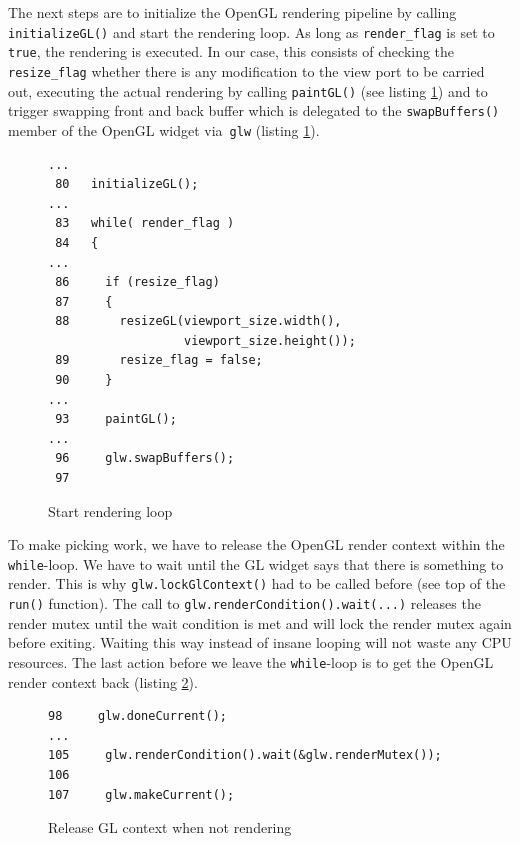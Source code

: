 \documentclass[jou,noapacite]{apa}
\begin{document}
The next steps are to initialize the OpenGL rendering pipeline by
calling \lstinline|initializeGL()| and start the rendering loop.
%
As long as \lstinline|render_flag| is set to \lstinline[keywordstyle=\color{black}]|true|, the rendering is executed.
%
In our case, this consists of checking the \lstinline|resize_flag| whether there
is any modification to the view port to be carried out, executing the actual
rendering by calling \lstinline|paintGL()| (see listing \ref{lst:rloop}) and to trigger swapping
front and back buffer which is delegated to the \lstinline|swapBuffers()| member
of the OpenGL widget via~\lstinline|glw| (listing \ref{lst:rloop}).
%
\begin{figure}[h]
\begin{lstlisting}[basicstyle=\scriptsize]
...
 80   initializeGL();
...
 83   while( render_flag )
 84   {
...
 86     if (resize_flag)
 87     {
 88       resizeGL(viewport_size.width(),
                   viewport_size.height());
 89       resize_flag = false;
 90     }
...
 93     paintGL();
...
 96     glw.swapBuffers();
 97
\end{lstlisting}
\caption{Start rendering loop}
\label{lst:rloop}
\end{figure}

To make picking work, we have to release the OpenGL render context within
the \lstinline[keywordstyle=\color{black}]|while|-loop.
%
We have to wait until the GL widget says that there is something to render.
%
This is why \lstinline|glw.lockGlContext()| had to be called before (see top of
the \lstinline|run()| function).
%
The call to \lstinline|glw.renderCondition().wait(...)| releases the render
mutex until the wait condition is met and will lock the render mutex again
before exiting.
%
Waiting this way instead of insane looping will not waste any CPU resources.
%
The last action before we leave the \lstinline[keywordstyle=\color{black}]|while|-loop is to get the OpenGL
render context back (listing \ref{lst:waitcond}).
%
\begin{figure}[h]
\begin{lstlisting}[basicstyle=\scriptsize]
 98     glw.doneCurrent();
...
105     glw.renderCondition().wait(&glw.renderMutex());
106
107     glw.makeCurrent();
\end{lstlisting}
\caption{Release GL context when not rendering}
\label{lst:waitcond}
\end{figure}
\end{document}
